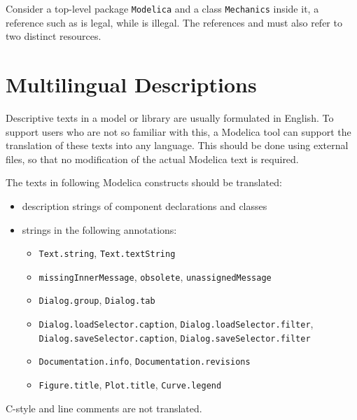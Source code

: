 \begin{example}
Consider a top-level package \lstinline!Modelica! and a class
\lstinline!Mechanics! inside it, a reference such as
 is legal, while
 is illegal.
The references  and  must also refer to two distinct resources.
\end{example}

\section{Multilingual Descriptions}\label{multilingual-descriptions}

\begin{nonnormative}
Descriptive texts in a model or library are usually formulated in English.
To support users who are not so familiar with this, a Modelica tool can support the translation of these texts into any language.
This should be done using external files, so that no modification of the actual Modelica text is required.
\end{nonnormative}

The texts in following Modelica constructs should be translated:
\begin{itemize}
\item description strings of component declarations and classes
\item strings in the following annotations:
\begin{itemize}
\item \lstinline!Text.string!, \lstinline!Text.textString!
\item \lstinline!missingInnerMessage!, \lstinline!obsolete!, \lstinline!unassignedMessage!
\item \lstinline!Dialog.group!, \lstinline!Dialog.tab!
\item \lstinline!Dialog.loadSelector.caption!, \lstinline!Dialog.loadSelector.filter!, \lstinline!Dialog.saveSelector.caption!, \lstinline!Dialog.saveSelector.filter!
\item \lstinline!Documentation.info!, \lstinline!Documentation.revisions!
\item \lstinline!Figure.title!, \lstinline!Plot.title!, \lstinline!Curve.legend!
\end{itemize}
\end{itemize}

C-style and line comments are not translated.

